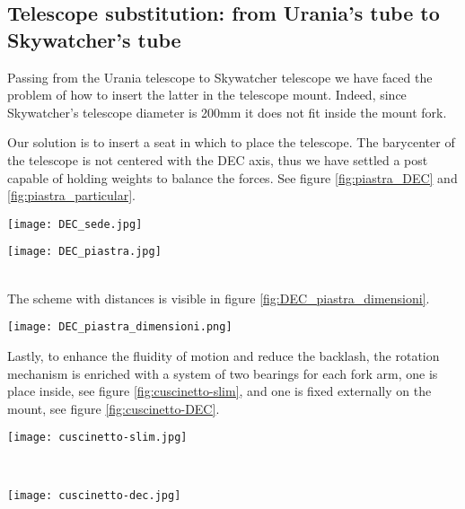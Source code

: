 \subsection{Telescope substitution: from Urania's tube to Skywatcher's tube}
Passing from the Urania telescope to Skywatcher telescope we have faced the problem of how to insert the latter in the telescope mount.
Indeed, since Skywatcher's telescope diameter is 200mm it does not fit inside the mount fork.

Our solution is to insert a seat in which to place the telescope.
The barycenter of the telescope is not centered with the DEC axis, thus we have settled a post capable of holding weights to balance the forces.
See figure \ref{fig:piastra_DEC} and \ref{fig:piastra_particular}.
\\
\begin{minipage}{0.25\textwidth}
    \centering
    \texttt{[image: DEC\_sede.jpg]}
    \label{fig:piastra_DEC}
\end{minipage}
\begin{minipage}
    {0.25\textwidth}
    \centering
    \texttt{[image: DEC\_piastra.jpg]}
    \label{fig:piastra_particular}
\end{minipage}
\\
The scheme with distances is visible in figure \ref{fig:DEC_piastra_dimensioni}.
\\
\begin{minipage}
    {0.5\textwidth}
    \centering
    \texttt{[image: DEC\_piastra\_dimensioni.png]}
    \label{fig:DEC_piastra_dimensioni}
\end{minipage}

Lastly, to enhance the fluidity of motion and reduce the backlash, the rotation mechanism is enriched with a system of two bearings for each fork arm, one is place inside, see figure \ref{fig:cuscinetto-slim}, and one is fixed externally on the mount, see figure \ref{fig:cuscinetto-DEC}.
\\
\begin{minipage}
    {.5\textwidth}
    \centering
    \texttt{[image: cuscinetto-slim.jpg]}
    \label{fig:cuscinetto-slim}
\end{minipage}
\\
\begin{minipage}
    {.5\textwidth}
    \centering
    \texttt{[image: cuscinetto-dec.jpg]}
    \label{fig:cuscinetto-DEC}
\end{minipage}
